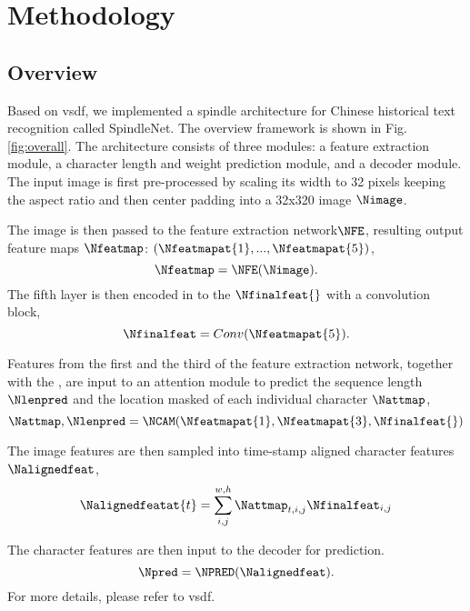 
\section{Methodology}

\subsection{Overview}

Based on vsdf\cite{vsdf}, we implemented a spindle architecture for Chinese historical text recognition called SpindleNet. 
The overview framework is shown in Fig.\ref{fig:overall}. The architecture consists of three modules: a feature extraction module, a character length and weight prediction module, and a decoder module. The input image is first pre-processed by scaling its width to 32 pixels keeping the aspect ratio and then center padding into a 32x320 image $\Nimage$. 

The image is then passed to the feature extraction network$\NFE$, resulting output feature maps $\Nfeatmap$: $(\Nfeatmapat{1}, ... ,\Nfeatmapat{5})$, 
\begin{equation}
    \Nfeatmap=\NFE(\Nimage).
\end{equation}
The fifth layer is then encoded in to the \Tefinalfeat{} $\Nfinalfeat{}$ with a convolution block,
\begin{equation}
    \Nfinalfeat=Conv(\Nfeatmapat{5}).
\end{equation}

Features from the first and the third of the feature extraction network, together with the \Tefinalfeat{}, are input to an attention module to predict the sequence length $\Nlenpred$ and the location masked of each individual character $\Nattmap$,
\begin{equation}
    \Nattmap,\Nlenpred=\NCAM(\Nfeatmapat{1}, \Nfeatmapat{3}, \Nfinalfeat{})
\end{equation}

The image features are then sampled into time-stamp aligned character features $\Nalignedfeat$, 
\begin{equation}
    \Nalignedfeatat{t}=\sum_{i,j}^{w,h} \Nattmap_{t,i,j}\Nfinalfeat_{i,j}
\end{equation}

The character features are then input to the decoder for prediction. 
\begin{equation}
    \Npred=\NPRED(\Nalignedfeat).
\end{equation}
For more details, please refer to vsdf\cite{vsdf}.

